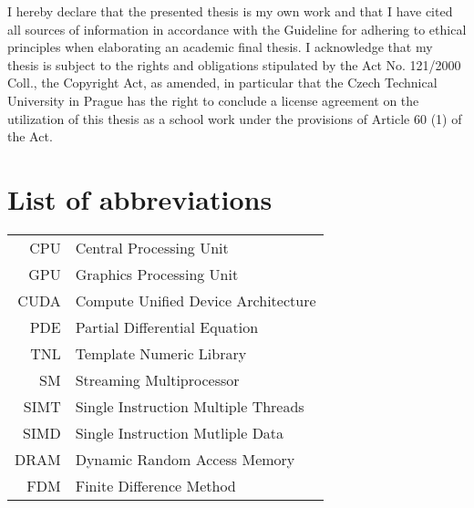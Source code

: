 \documentclass[english,bachelor,unicode]{ctufit-thesis}
\theoremstyle{plain}
\theoremstyle{definition}
\theoremstyle{remark}
\numberwithin{theorem}{chapter}
\begin{document}
\begin{declarationpage}
    I hereby declare that the presented thesis is my own work and that I have cited all sources of information in accordance with the Guideline for adhering to ethical principles when elaborating an academic final thesis.
    I acknowledge that my thesis is subject to the rights and obligations stipulated by the Act No. 121/2000 Coll., the Copyright Act, as amended, in particular that the Czech Technical University in Prague has the right to conclude a license agreement on the utilization of this thesis as a school work under the provisions of Article 60 (1) of the Act.
\end{declarationpage}

\printabstractpage %

\chapter{List of abbreviations}

\begin{tabular}{rl}
CPU & Central Processing Unit\\
GPU & Graphics Processing Unit\\
CUDA & Compute Unified Device Architecture\\
PDE & Partial Differential Equation\\
TNL & Template Numeric Library\\
SM & Streaming Multiprocessor\\
SIMT & Single Instruction Multiple Threads\\
SIMD & Single Instruction Mutliple Data \\
DRAM & Dynamic Random Access Memory \\
FDM & Finite Difference Method
\end{tabular}
\end{document}
